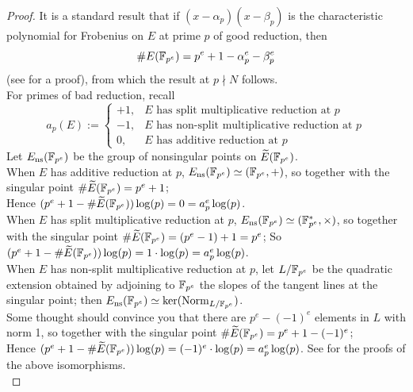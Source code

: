\documentclass[10pt]{article}
\newcommand{\Ensfpe}{E_{\text{ns}}(\FF_{p^e})}
\begin{document}
\begin{proof}
It is a standard result that if $(x-\alpha_p)(x-\beta_p)$ is the characteristic polynomial for Frobenius on $E$ at prime $p$ of good reduction, then
\begin{equation}
\#E(\mathbb{F}_{p^e}) = p^e + 1 - \alpha_p^e - \beta_p^e
\end{equation}
(see \cite[pp. 134-136]{Sil-1985} for a proof), from which the result at $p \nmid N$ follows. \\

For primes of bad reduction, recall
\begin{equation}
a_p(E) := \begin{cases}
+1, & \text{$E$ has split multiplicative reduction at $p$} \\
-1, & \text{$E$ has non-split multiplicative reduction at $p$} \\
0, & \text{$E$ has additive reduction at $p$}
\end{cases}
\end{equation}
Let $\Ensfpe$ be the group of nonsingular points on $\widetilde{E}(\mathbb{F}_{p^e})$. \\
When $E$ has additive reduction at $p$, $\Ensfpe \simeq (\F_{p^e},+)$, so together with the singular point $\#\widetilde{E}(\mathbb{F}_{p^e}) = p^e+1$; \\
Hence $(p^e + 1 - \#\widetilde{E}(\mathbb{F}_{p^e}))\log(p) = 0 = a_p^e \log(p)$. \\
When $E$ has split multiplicative reduction at $p$, $\Ensfpe \simeq (\F_{p^e}^*,\times)$, so together with the singular point $\#\widetilde{E}(\mathbb{F}_{p^e}) = (p^e-1)+1 = p^e$; So $(p^e + 1 - \#\widetilde{E}(\mathbb{F}_{p^e}))\log(p) = 1\cdot \log(p) = a_p^e \log(p)$. \\
When $E$ has non-split multiplicative reduction at $p$, let $L/\mathbb{F}_{p^e}$ be the quadratic extension obtained by adjoining to $\mathbb{F}_{p^e}$ the slopes of the tangent lines  at the singular point; then $\Ensfpe \simeq \ker(\Norm_{L/\FF_{p^e}})$. \\
Some thought should convince you that there are $p^e-(-1)^e$ elements in $L$ with norm 1, so together with the singular point $\#\widetilde{E}(\mathbb{F}_{p^e}) = p^e+1-(-1)^e$; \\
Hence $(p^e + 1 - \#\widetilde{E}(\mathbb{F}_{p^e}))\log(p) = (-1)^e\cdot \log(p) = a_p^e \log(p)$.
See \cite[pg. 180, Prop. 5.1]{Sil-1985} for the proofs of the above isomorphisms.\\
\end{proof}
\end{document}
